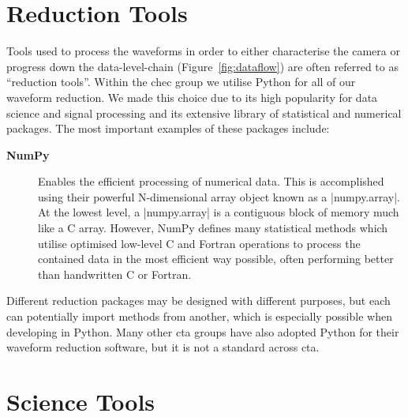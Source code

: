 \section{Reduction Tools}

Tools used to process the waveforms in order to either characterise the camera or progress down the data-level-chain (Figure~\ref{fig:dataflow}) are often referred to as ``reduction tools''. Within the \gls{chec} group we utilise Python for all of our waveform reduction. We made this choice due to its high popularity for data science and signal processing and its extensive library of statistical and numerical packages. The most important examples of these packages include:

\begin{description}
\item [\textbf{NumPy\footnotemark}]  Enables the efficient processing of numerical data. This is accomplished using their powerful N-dimensional array object known as a |numpy.array|. At the lowest level, a |numpy.array| is a contiguous block of memory much like a C array. However, NumPy defines many statistical methods which utilise optimised low-level C and Fortran operations to process the contained data in the most efficient way possible, often performing better than handwritten C or Fortran.
\end{description}

Different reduction packages may be designed with different purposes, but each can potentially import methods from another, which is especially possible when developing in Python. Many other \gls{cta} groups have also adopted Python for their waveform reduction software, but it is not a standard across \gls{cta}.

\subsection{}

\subsection{}

\section{Science Tools}

\subsection{}

\subsection{}